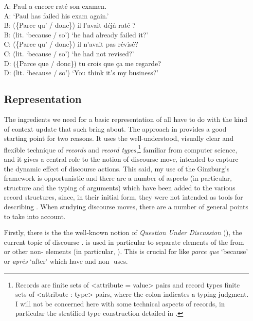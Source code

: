 \documentclass[output=paper,colorlinks,citecolor=brown]{langscibook}
\begin{document}
\ea \label{connectives-in-dialogue:Jayez}
A: Paul a encore raté son examen.\\
A: `Paul has failed his exam again.'\\
B: (\{Parce qu' / donc\}) il l'avait déjà raté ?\\
B: (lit. `because / so') `he had already failed it?'\\
C: (\{Parce qu' / donc\}) il n'avait pas révisé?\\
C: (lit. `because / so') `he had not revised?'\\
D: (\{Parce que / donc\}) tu crois que ça me regarde?\\
D: (lit. `because / so') `You think it's my business?'
\z


\subsection{Representation}
\label{sec-representation1:Jayez}


The ingredients we need for a basic representation of   all have to do with the kind of context update that such  bring about. The approach in \citet{Ginzburg:2012} provides a good starting point for two reasons. It uses the well-understood, visually clear and flexible technique of \textit{records} and \textit{record types},\footnote{Records are finite sets of <attribute = value> pairs and record types finite sets of <attribute : type> pairs, where the colon indicates a typing judgment. I will not be concerned here with some technical aspects of records, in particular the stratified type construction detailed in \citet{Cooper:2023}.} familiar from computer science, and it gives a central role to the notion of discourse move, intended to capture the dynamic effect of discourse actions. This said, my use of the Ginzburg's framework is opportunistic and there are a number of aspects (in particular,  structure and the typing of  arguments) which have been added to the various record structures, since, in their initial form, they were not intended as tools for describing . When studying discourse moves, there are a number of general points to take into account.

	Firstly, there  is the the well-known notion of \textit{Question Under Discussion} (), the current topic of discourse \citep{Roberts:2012}.  is used in particular to separate elements of the  from  or other non- elements (in particular, ). This is crucial for  like \textit{parce que} `because' or \textit{après} `after' which have  and non- uses.
\end{document}
